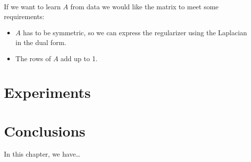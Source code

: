 If we want to learn $A$ from data we would like the matrix to meet some requirements:
\begin{itemize}
    \item $A$ has to be symmetric, so we can express the regularizer using the Laplacian in the dual form.
    \item The rows of $A$ add up to 1. 
\end{itemize} 

\section{Experiments}

\section{Conclusions}\label{sec-conclusions-4}

In this chapter, we have\dots
